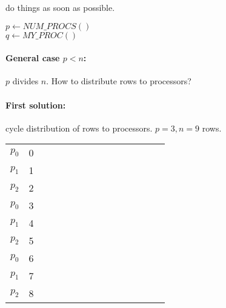  do things as soon as possible.


\begin{algorithm}[H]
$p\leftarrow NUM\_PROCS()$\\
$q\leftarrow MY\_PROC()$\\

\tcp{-----}


\end{algorithm}


\paragraph{General case $p<n$:} $p$ divides $n$. How to distribute rows to processors?

\paragraph{First solution:} cycle distribution of rows to processors. $p=3, n=9$ rows.

\begin{center}
\begin{tabular}{c c | c |}
\cline{3-3}
$p_0$ & 0 & $\qquad \qquad \qquad \qquad \qquad \qquad $\\
\cline{3-3}
$p_1$ & 1 & $\qquad \qquad \qquad \qquad \qquad \qquad $\\
\cline{3-3}
$p_2$ & 2 & $\qquad \qquad \qquad \qquad \qquad \qquad $\\
\cline{3-3}
$p_0$ & 3 & $\qquad \qquad \qquad \qquad \qquad \qquad $\\
\cline{3-3}
$p_1$ & 4 & $\qquad \qquad \qquad \qquad \qquad \qquad $\\
\cline{3-3}
$p_2$ & 5 & $\qquad \qquad \qquad \qquad \qquad \qquad $\\
\cline{3-3}
$p_0$ & 6 & $\qquad \qquad \qquad \qquad \qquad \qquad $\\
\cline{3-3}
$p_1$ & 7 & $\qquad \qquad \qquad \qquad \qquad \qquad $\\
\cline{3-3}
$p_2$ & 8 & $\qquad \qquad \qquad \qquad \qquad \qquad $\\
\cline{3-3}
\end{tabular}
\end{center}

